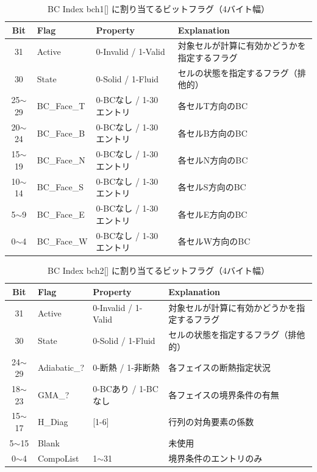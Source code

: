 \begin{table}[htdp]
\caption{BC Index bch1[] に割り当てるビットフラグ（4バイト幅）}
\begin{center}
\small
\begin{tabular}{clll} \toprule
Bit & Flag & Property & Explanation\\ \midrule
31 & Active & 0-Invalid / 1-Valid & 対象セルが計算に有効かどうかを指定するフラグ\\
30 & State  & 0-Solid / 1-Fluid & セルの状態を指定するフラグ（排他的）\\
25$\sim$29 & BC\_Face\_T & 0-BCなし / 1-30 エントリ  & 各セルT方向のBC\\
20$\sim$24 & BC\_Face\_B & 0-BCなし / 1-30 エントリ  & 各セルB方向のBC\\
15$\sim$19 & BC\_Face\_N & 0-BCなし / 1-30 エントリ  & 各セルN方向のBC\\
10$\sim$14 & BC\_Face\_S & 0-BCなし / 1-30 エントリ  & 各セルS方向のBC\\
5$\sim$9 & BC\_Face\_E & 0-BCなし / 1-30 エントリ  & 各セルE方向のBC\\
0$\sim$4 & BC\_Face\_W & 0-BCなし / 1-30 エントリ  & 各セルW方向のBC\\ \bottomrule
\end{tabular}
\end{center}
\label{tbl:Flags in bch1}
\end{table}




\begin{table}[htdp]
\caption{BC Index bch2[] に割り当てるビットフラグ（4バイト幅）}
\begin{center}
\small
\begin{tabular}{clll} \toprule
Bit & Flag & Property & Explanation\\ \midrule
31 & Active & 0-Invalid / 1-Valid & 対象セルが計算に有効かどうかを指定するフラグ\\
30 & State  & 0-Solid / 1-Fluid & セルの状態を指定するフラグ（排他的）\\
24$\sim$29 & Adiabatic\_? & 0-断熱 / 1-非断熱  & 各フェイスの断熱指定状況\\
18$\sim$23 & GMA\_? & 0-BCあり / 1-BCなし  & 各フェイスの境界条件の有無\\
15$\sim$17 & H\_Diag & [1-6]  & 行列の対角要素の係数\\
5$\sim$15 & Blank &  & 未使用\\ 
0$\sim$4 & CompoList & 1$\sim$31 & 境界条件のエントリのみ\\ \bottomrule
\end{tabular}
\end{center}
\label{tbl:Flags in bch2}
\end{table}


